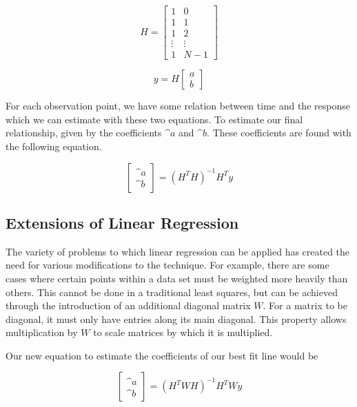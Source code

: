 \begin{equation}
H
=
\begin{bmatrix}
1 & 0 \\
1 & 1 \\
1 & 2 \\
\vdots & \vdots \\
1 & N-1 
\end{bmatrix}
\end{equation}

\begin{equation}
y
=
H
\begin{bmatrix}
a \\
b
\end{bmatrix}
\end{equation}

For each observation point, we have some relation between time and the response which we can estimate with these two equations. To estimate our final relationship, given by the coefficients $\^{a}$ and $\^{b}$. These coefficients are found with the following equation.

\begin{equation}
\begin{bmatrix}
\^{a} \\
\^{b}
\end{bmatrix}
=
(H^{T}H)^{-1}H^{T}y
\end{equation}

\subsection{Extensions of Linear Regression}

The variety of problems to which linear regression can be applied has created the need for various modifications to the technique. For example, there are some cases where certain points within a data set must be weighted more heavily than others. This cannot be done in a traditional least squares, but can be achieved through the introduction of an additional diagonal matrix $W$. For a matrix to be diagonal, it must only have entries along its main diagonal. This property allows  multiplication by $W$ to scale matrices by which it is multiplied. \newline

Our new equation to estimate the coefficients of our best fit line would be

\begin{equation}
\begin{bmatrix}
\^{a} \\
\^{b}
\end{bmatrix}
=
(H^{T}WH)^{-1}H^{T}Wy
\end{equation}

